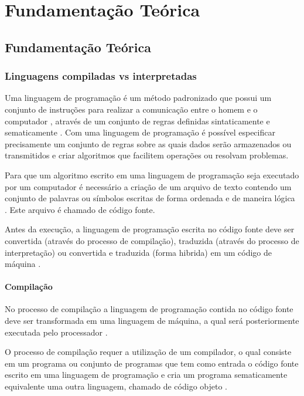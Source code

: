 \part{Fundamentação Teórica}

\chapter[Fundamentação Teórica]{Fundamentação Teórica}

\section{Linguagens compiladas vs interpretadas}

Uma linguagem de programação é um método padronizado que possui um conjunto de
 instruções para realizar a comunicação entre o homem e o computador 
\cite{ref1}, através de um conjunto de regras definidas sintaticamente 
e sematicamente \cite{ref2}. Com uma linguagem de programação é possível 
especificar precisamente um conjunto de regras sobre  as quais dados serão
 armazenados ou transmitidos e criar algoritmos que facilitem operações 
ou resolvam problemas.
    
Para que um algoritmo escrito em uma linguagem de programação seja executado 
por um computador é necessário a criação de um arquivo de texto contendo um 
conjunto de palavras ou símbolos escritas de forma ordenada  e de maneira 
lógica \cite{ref3}. Este arquivo é chamado de código fonte.
    
Antes da execução, a linguagem de programação escrita no código fonte deve
 ser convertida (através do processo de compilação), traduzida (através do 
processo de interpretação) ou convertida e traduzida (forma hibrida) em um 
código de máquina \cite{ref4}.

\subsection{Compilação}

No processo de compilação a linguagem de programação contida no código fonte
 deve ser transformada em uma linguagem de máquina, a qual será posteriormente
 executada pelo processador \cite{ref2}. 

O processo de compilação requer a utilização de um compilador, o qual consiste
 em um programa ou conjunto de programas  que tem como entrada o código fonte 
escrito em uma linguagem de programação e cria um programa sematicamente 
equivalente uma outra linguagem, chamado de código objeto \cite{ref4}.

